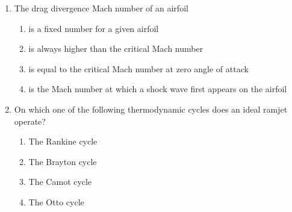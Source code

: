 \documentclass[journal]{IEEEtran}
\begin{document}
\begin{enumerate}
\item The drag divergence Mach number of an airfoil
\begin{enumerate}
\item is a fixed number for a given airfoil
\item is always higher than the critical Mach number
\item is equal to the critical Mach number at zero angle of attack
\item is the Mach number at which a shock wave first appears on the airfoil
\end{enumerate}


\item On which one of the following thermodynamic cycles does an ideal ramjet operate?
\begin{multicols}{2}
\begin{enumerate}
\item The Rankine cycle
\item The Brayton cycle
\item The Camot cycle
\item The Otto cycle
\end{enumerate}
\end{multicols}
\end{enumerate}
\end{document}
